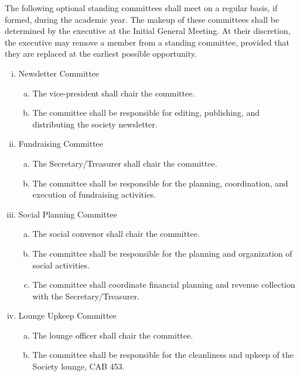 \documentclass[11pt]{article}
\begin{document}
\begin{enumerate}[I.]
\begin{enumerate}[A)]
      The following optional standing committees shall meet on a regular basis,
        if formed, during the academic year. The makeup of these committees
        shall be determined by the executive at the Initial General Meeting. At
        their discretion, the executive may remove a member from a standing
        committee, provided that they are replaced at the earliest possible
        opportunity.
        \begin{enumerate}[i)]
          \item Newsletter Committee
            \begin{enumerate}[a)]
              \item The vice-president shall chair the committee.
              \item The committee shall be responsible for editing, publishing,
                and distributing the society newsletter.
            \end{enumerate}
          \item Fundraising Committee
            \begin{enumerate}[a)]
              \item The Secretary/Treasurer shall chair the committee. 
              \item The committee shall be responsible for the planning,
                coordination, and execution of fundraising activities. 
            \end{enumerate}
          \item Social Planning Committee
            \begin{enumerate}[a)]
              \item The social convenor shall chair the committee. 
              \item The committee shall be responsible for the planning and
                organization of social activities. 
              \item The committee shall coordinate financial planning and
                revenue collection with the Secretary/Treasurer. 
            \end{enumerate}
          \item Lounge Upkeep Committee
            \begin{enumerate}[a)]
              \item The lounge officer shall chair the committee. 
              \item  The committee shall be responsible for the cleanliness and
                upkeep of the Society lounge, CAB 453. 

\end{enumerate}
\end{enumerate}
\end{enumerate}
\end{enumerate}
\end{document}
